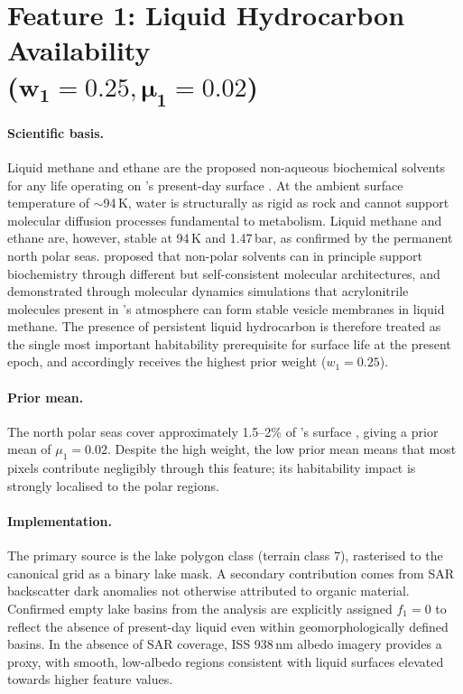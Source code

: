 \section[Feature 1: Liquid Hydrocarbon Availability 
  ($w_1 = 0.25, \mu_1 = 0.02$)]{Feature 1: Liquid Hydrocarbon Availability \\
  ($\boldsymbol{w_1 = 0.25, \mu_1 = 0.02}$)}
\label{sec:feat_lhc}

\paragraph{Scientific basis.}
Liquid methane and ethane are the proposed non-aqueous biochemical solvents
for any life operating on \titan{}'s present-day surface \citep{McKaySmith2005,
McKay2016}.  At the ambient surface temperature of $\sim$94\,K, water is
structurally as rigid as rock and cannot support molecular diffusion processes
fundamental to metabolism.  Liquid methane and ethane are, however, stable
at 94\,K and 1.47\,bar, as confirmed by the permanent north polar seas.
\citet{Benner2004} proposed that non-polar solvents can in principle support
biochemistry through different but self-consistent molecular architectures, and
\citet{Stevenson2015} demonstrated through molecular dynamics simulations that
acrylonitrile molecules present in \titan{}'s atmosphere can form stable
vesicle membranes in liquid methane.  The presence of persistent liquid
hydrocarbon is therefore treated as the single most important habitability
prerequisite for surface life at the present epoch, and accordingly receives
the highest prior weight ($w_1 = 0.25$).

\paragraph{Prior mean.}
The north polar seas cover approximately 1.5--2\% of \titan{}'s surface
\citep{Hayes2008}, giving a prior mean of $\mu_1 = 0.02$.  Despite the high
weight, the low prior mean means that most pixels contribute negligibly through
this feature; its habitability impact is strongly localised to the polar
regions.

\paragraph{Implementation.}
The primary source is the \citet{Lopes2019} lake polygon class (terrain
class 7), rasterised to the canonical grid as a binary lake mask.  A secondary
contribution comes from SAR backscatter dark anomalies not otherwise attributed
to organic material.  Confirmed empty lake basins from the \citet{BirchHayesSAR}
analysis are explicitly assigned $f_1 = 0$ to reflect the absence of
present-day liquid even within geomorphologically defined basins.  In the
absence of SAR coverage, ISS 938\,nm albedo imagery provides a proxy, with
smooth, low-albedo regions consistent with liquid surfaces elevated towards
higher feature values.

